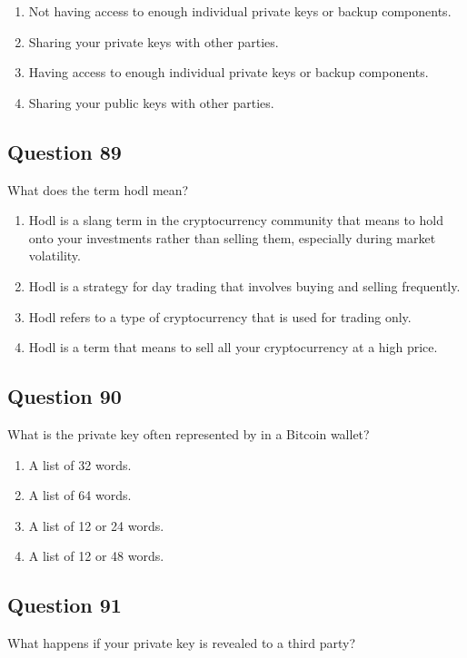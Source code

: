 \documentclass[12pt,a4paper]{article}
\begin{document}
\begin{enumerate}[label=\Alph*., leftmargin=*]
\item Not having access to enough individual private keys or backup components.
\item Sharing your private keys with other parties.
\item Having access to enough individual private keys or backup components.
\item Sharing your public keys with other parties.
\end{enumerate}

\bigskip


\subsection*{Question 89}
What does the term hodl mean?

\begin{enumerate}[label=\Alph*., leftmargin=*]
\item Hodl is a slang term in the cryptocurrency community that means to hold onto your investments rather than selling them, especially during market volatility.
\item Hodl is a strategy for day trading that involves buying and selling frequently.
\item Hodl refers to a type of cryptocurrency that is used for trading only.
\item Hodl is a term that means to sell all your cryptocurrency at a high price.
\end{enumerate}

\bigskip


\subsection*{Question 90}
What is the private key often represented by in a Bitcoin wallet?

\begin{enumerate}[label=\Alph*., leftmargin=*]
\item A list of 32 words.
\item A list of 64 words.
\item A list of 12 or 24 words.
\item A list of 12 or 48 words.
\end{enumerate}

\bigskip


\subsection*{Question 91}
What happens if your private key is revealed to a third party?
\end{document}
